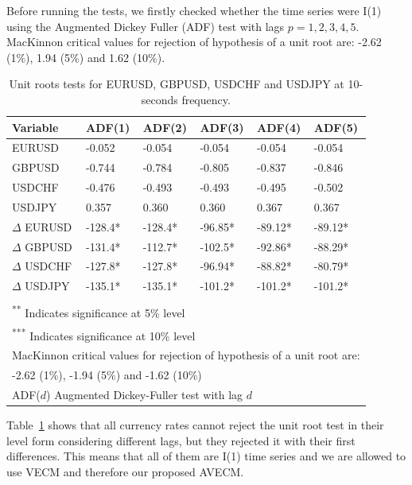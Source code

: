 Before running the tests, we firstly checked whether the time series were I(1)
using the Augmented Dickey Fuller (ADF) test with lags $p=1,2,3,4,5$.  MacKinnon
\citep{mackinnon2010} critical values for rejection of hypothesis of a unit root
are: -2.62 (1\%), 1.94 (5\%) and 1.62 (10\%).
\begin{table}[ht]
\label{tab:adf}
\centering
\begin{tabular}{llllll}
\toprule
{Variable} & {ADF(1)} & {ADF(2)} & {ADF(3)} & {ADF(4)} & {ADF(5)}\\ 
\midrule
EURUSD &  -0.052   & -0.054  & -0.054  & -0.054  & -0.054  \\
GBPUSD &  -0.744  & -0.784  & -0.805  & -0.837  & -0.846  \\
USDCHF &  -0.476   & -0.493  & -0.493  & -0.495  & -0.502  \\
USDJPY &  0.357   & 0.360  & 0.360  & 0.367  & 0.367  \\
$\Delta$ EURUSD & -128.4*  & -128.4*  & -96.85* & -89.12*   & -89.12*\\
$\Delta$ GBPUSD & -131.4*  & -112.7*  & -102.5* & -92.86*   & -88.29*\\
$\Delta$ USDCHF & -127.8*  & -127.8*  & -96.94* & -88.82*   & -80.79*\\
$\Delta$ USDJPY & -135.1*  & -135.1*  & -101.2* & -101.2*   & -101.2*\\
\bottomrule
\addlinespace[1ex]
\multicolumn{6}{l}{ \textsuperscript{*} Indicates significance at 1\% level} \\
\multicolumn{6}{l}{ \textsuperscript{**} Indicates significance at 5\% level} \\
\multicolumn{6}{l}{ \textsuperscript{***} Indicates significance at 10\% level} \\
\multicolumn{6}{l}{MacKinnon critical values for rejection of hypothesis of a unit root are:}\\
\multicolumn{6}{l}{ -2.62 (1\%), -1.94 (5\%) and -1.62 (10\%)}\\
\multicolumn{6}{l}{ADF($d$) Augmented Dickey-Fuller test with lag $d$} 
\end{tabular}
\caption{Unit roots tests for EURUSD, GBPUSD, USDCHF and USDJPY at 10-seconds
frequency.}
\end{table}
Table~\ref{tab:adf} shows that all currency rates cannot reject the unit root
test in their level form considering different lags, but they rejected it with
their first differences. This means that all of them are I(1) time series and we
are allowed to use VECM and therefore our proposed AVECM.

